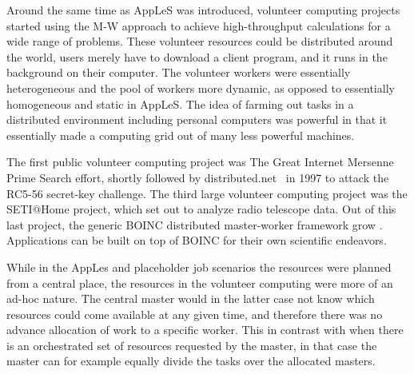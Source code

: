 \documentclass{sig-alternate}
\begin{document}


Around the same time as AppLeS was introduced, volunteer computing
projects started using the M-W approach to achieve high-throughput calculations
for a wide range of problems.
These volunteer resources could be distributed around the world, users
merely have to download a client program, and it runs in the
background on their computer.  The volunteer workers were essentially
heterogeneous and the pool of workers more dynamic, as opposed to
essentially homogeneous and static in AppLeS. The idea of farming out
tasks in a distributed environment including personal computers was
powerful in that it essentially made a computing grid out of many less
powerful machines.

The first public volunteer computing project was The Great Internet Mersenne
Prime Search effort\cite{woltman:2004:gimps}, shortly followed by
distributed.net~\cite{Lawton:2000:distributednet} in 1997 to attack the RC5-56
secret-key challenge.
The third large volunteer computing project was the SETI@Home project, which
set out to analyze radio telescope data.
Out of this last project, the generic BOINC distributed master-worker framework
grow \cite{Anderson:2004:BSP:1032646.1033223}.
Applications can be built on top of BOINC for their own scientific endeavors.

While in the AppLes and placeholder job scenarios the resources were planned
from a central place, the resources in the volunteer computing were more of an
ad-hoc nature.
The central master would in the latter case not know which resources could come
available at any given time, and therefore there was no advance allocation of
work to a specific worker.
This in contrast with when there is an orchestrated set of resources requested
by the master, in that case the master can for example equally divide the tasks
over the allocated masters.
\end{document}
